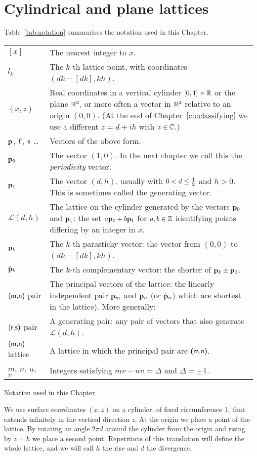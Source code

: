 \section{Cylindrical and plane lattices}
Table~\ref{tab:notation} summarises the notation used in this Chapter. 
\begin{margintable}
	\begin{tabular}{lL{7cm}}
		\hline
		$[x]$ & The nearest integer to $x$. 
		\\
	$l_k$ & The $k$-th lattice point, with coordinates $(dk - [dk],kh)$. 
		\\
		$(x,z)$ & Real coordinates in a vertical cylinder $[0,1]\times\mathbb{R}$ or the plane $\mathbb{R}^2$, or more often a vector in $\mathbb{R}^2$ relative to an origin $(0,0)$. (At the end of Chapter~\ref{ch:classifying} we use a different $z=d+ih$ with $z\in\mathbb{C}$.)
		\\
		${\mathbf p}_{}$, $\mathbf{f}$, $\mathbf{s}$ \ldots & Vectors of the above form.
		\\
		${\mathbf p}_{0}$ & The vector $(1,0)$. In the next chapter we call this the \textit{periodicity} vector.
		\\
		${\mathbf p}_{1}$ & The vector $(d,h)$, usually with $0< d\leq \textstyle{\frac{1}{2}}$ and $h>0$. This is sometimes called the generating vector. 
\\
		$\mathcal{L}(d,h)$ & The lattice on the cylinder generated by the vectors ${\mathbf p}_{0}$ and ${\mathbf p}_{1}$:	the set $a{\mathbf p}_{0}+b{\mathbf p}_{1}$ for $a,b\in \mathbb{Z}$ identifying points differing by an integer in $x$. 
		\\
		${\mathbf p}_{k}$ & The $k$-th parastichy vector: the vector from $(0,0)$ to $(dk-[dk],kh)$.
		\\
		$\hat{\mathbf p}_{k}$ & The $k$-th complementary vector: the shorter of ${\mathbf p}_{k}\pm{\mathbf p}_{0}$.
		\\
		$\textsf{(m,n)}$ pair & The principal vectors of the lattice: the linearly independent pair $	{\mathbf p}_{m}$ and ${\mathbf p}_{n}$ (or $\hat{\mathbf p}_{n}$)  which are shortest in the lattice). More generally:
		\\
		$\textsf{(r,s)}$ pair & A generating pair: any pair of vectors that also generate $\mathcal{L}(d,h)$.
		\\
		$\textsf{(m,n)}$ lattice & A lattice in which the principal pair 
		are $\textsf{(m,n)}$.
		\\
		$m$, $n$, $u$, $v$ & Integers satisfying $m v- n u=\Delta$ and $\Delta=\pm 1$.
		\\\hline
	\end{tabular}
	\caption{Notation used in this Chapter.}
	\label{tab:notation}
\end{margintable}
\clearpage
\label{sec:latticedef}
We use surface coordinates $(x,z)$ on a cylinder, of fixed circumference 1, that extends infinitely in the vertical direction $z$.  At the origin we place a point of the lattice. By rotating an angle $2\pi d$ around the cylinder from the origin and rising by $z=h$
we place a second point. Repetitions of this translation will define the whole lattice,  and we will call  
$h$ the {rise} and $d$ the divergence. 


